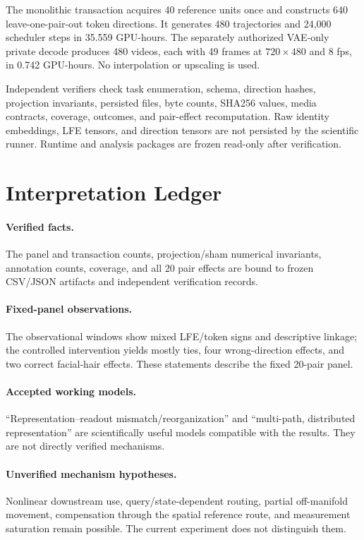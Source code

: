 \documentclass[10pt,twocolumn,letterpaper]{article}
\begin{document}
The monolithic transaction acquires 40 reference units once and constructs 640
leave-one-pair-out token directions.  It generates 480 trajectories and 24,000
scheduler steps in 35.559 GPU-hours.  The separately authorized VAE-only private
decode produces 480 videos, each with 49 frames at $720\times480$ and 8 fps, in
0.742 GPU-hours.  No interpolation or upscaling is used.

Independent verifiers check task enumeration, schema, direction hashes,
projection invariants, persisted files, byte counts, SHA256 values, media
contracts, coverage, outcomes, and pair-effect recomputation.  Raw identity
embeddings, LFE tensors, and direction tensors are not persisted by the
scientific runner.  Runtime and analysis packages are frozen read-only after
verification.

\section{Interpretation Ledger}

\paragraph{Verified facts.}
The panel and transaction counts, projection/sham numerical invariants,
annotation counts, coverage, and all 20 pair effects are bound to frozen
CSV/JSON artifacts and independent verification records.

\paragraph{Fixed-panel observations.}
The observational windows show mixed LFE/token signs and descriptive linkage;
the controlled intervention yields mostly ties, four wrong-direction effects,
and two correct facial-hair effects.  These statements describe the fixed
20-pair panel.

\paragraph{Accepted working models.}
``Representation--readout mismatch/reorganization'' and ``multi-path,
distributed representation'' are scientifically useful models compatible with
the results.  They are not directly verified mechanisms.

\paragraph{Unverified mechanism hypotheses.}
Nonlinear downstream use, query/state-dependent routing, partial off-manifold
movement, compensation through the spatial reference route, and measurement
saturation remain possible.  The current experiment does not distinguish them.
\end{document}
